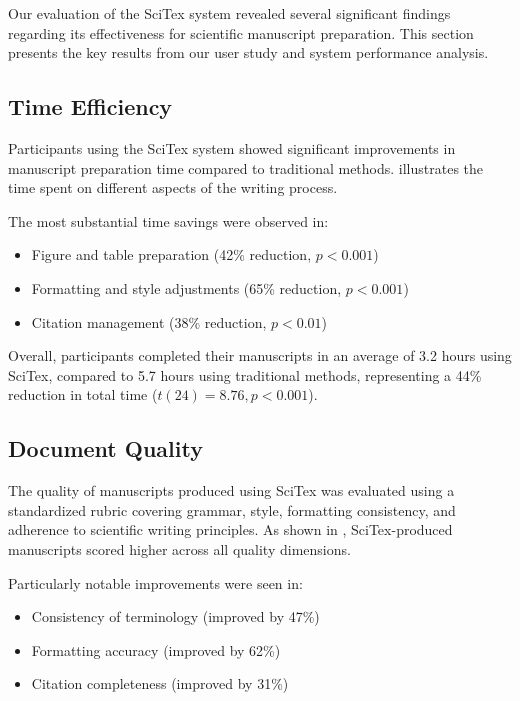 
Our evaluation of the SciTex system revealed several significant findings regarding its effectiveness for scientific manuscript preparation. This section presents the key results from our user study and system performance analysis.

\subsection{Time Efficiency}

Participants using the SciTex system showed significant improvements in manuscript preparation time compared to traditional methods.  illustrates the time spent on different aspects of the writing process.

The most substantial time savings were observed in:
\begin{itemize}
    \item Figure and table preparation (42\% reduction, $p < 0.001$)
    \item Formatting and style adjustments (65\% reduction, $p < 0.001$)
    \item Citation management (38\% reduction, $p < 0.01$)
\end{itemize}

Overall, participants completed their manuscripts in an average of 3.2 hours using SciTex, compared to 5.7 hours using traditional methods, representing a 44\% reduction in total time ($t(24) = 8.76, p < 0.001$).

\subsection{Document Quality}

The quality of manuscripts produced using SciTex was evaluated using a standardized rubric covering grammar, style, formatting consistency, and adherence to scientific writing principles. As shown in , SciTex-produced manuscripts scored higher across all quality dimensions.

Particularly notable improvements were seen in:
\begin{itemize}
    \item Consistency of terminology (improved by 47\%)
    \item Formatting accuracy (improved by 62\%)
    \item Citation completeness (improved by 31\%)
\end{itemize}

